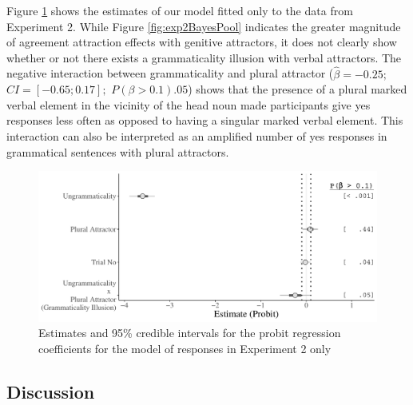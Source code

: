 


Figure \ref{fig:exp2Bayesonly2} shows the estimates of our model fitted only to the data from Experiment 2. While Figure \ref{fig:exp2BayesPool} indicates the greater magnitude of agreement attraction effects with genitive attractors, it does not clearly show whether or not there exists a grammaticality illusion with verbal attractors. The negative interaction between grammaticality and plural attractor ($\hat{\beta}=-0.25;$ $CI=[-0.65; 0.17];$ $P(\beta>0.1)   .05$) shows that the presence of a plural marked verbal element in the vicinity of the head noun made participants give yes responses less often as opposed to having a singular marked verbal element. This interaction can also be interpreted as an amplified number of yes responses in grammatical sentences with plural attractors. 


\begin{knitrout}
\color{fgcolor}\begin{figure}[hbt!]

{\centering \includegraphics[width=\linewidth]{figure/exp2Bayesonly2-1} 

}

\caption[Estimates and 95\% credible intervals for the probit regression coefficients for the model of responses in Experiment 2 only]{Estimates and 95\% credible intervals for the probit regression coefficients for the model of responses in Experiment 2 only}\label{fig:exp2Bayesonly2}
\end{figure}

\end{knitrout}

\subsection{Discussion}


